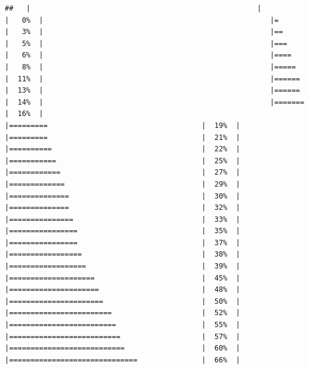 \documentclass[
  krantz2]{krantz}
\begin{document}
\begin{verbatim}
##   |                                                     |                                             |   0%  |                                                     |=                                            |   3%  |                                                     |==                                           |   5%  |                                                     |===                                          |   6%  |                                                     |====                                         |   8%  |                                                     |=====                                        |  11%  |                                                     |======                                       |  13%  |                                                     |======                                       |  14%  |                                                     |=======                                      |  16%  |                                                     |=========                                    |  19%  |                                                     |=========                                    |  21%  |                                                     |==========                                   |  22%  |                                                     |===========                                  |  25%  |                                                     |============                                 |  27%  |                                                     |=============                                |  29%  |                                                     |==============                               |  30%  |                                                     |==============                               |  32%  |                                                     |===============                              |  33%  |                                                     |================                             |  35%  |                                                     |================                             |  37%  |                                                     |=================                            |  38%  |                                                     |==================                           |  39%  |                                                     |====================                         |  45%  |                                                     |=====================                        |  48%  |                                                     |======================                       |  50%  |                                                     |========================                     |  52%  |                                                     |=========================                    |  55%  |                                                     |==========================                   |  57%  |                                                     |===========================                  |  60%  |                                                     |==============================               |  66%  |         
\end{verbatim}
\end{document}
